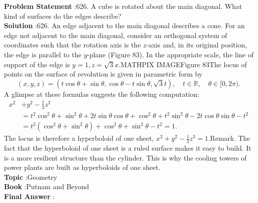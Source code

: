\documentclass[10pt]{article}
\begin{document}
\textbf{Problem Statement} :626. A cube is rotated about the main diagonal. What kind of surfaces do the edges describe?\\
\textbf{Solution} :626. An edge adjacent to the main diagonal describes a cone. For an edge not adjacent to the main diagonal, consider an orthogonal system of coordinates such that the rotation axis is the $z$-axis and, in its original position, the edge is parallel to the $y$-plane (Figure 83). In the appropriate scale, the line of support of the edge is $y=1, z=\sqrt{3} x$.MATHPIX IMAGEFigure 83The locus of points on the surface of revolution is given in parametric form by$$ (x, y, z)=(t \cos \theta+\sin \theta, \cos \theta-t \sin \theta, \sqrt{3} t), \quad t \in \mathbb{R}, \quad \theta \in[0,2 \pi) . $$A glimpse at these formulas suggests the following computation:$$ \begin{aligned} x^{2} &+y^{2}-\frac{1}{3} z^{2} \\ &=t^{2} \cos ^{2} \theta+\sin ^{2} \theta+2 t \sin \theta \cos \theta+\cos ^{2} \theta+t^{2} \sin ^{2} \theta-2 t \cos \theta \sin \theta-t^{2} \\ &=t^{2}\left(\cos ^{2} \theta+\sin ^{2} \theta\right)+\cos ^{2} \theta+\sin ^{2} \theta-t^{2}=1 . \end{aligned} $$The locus is therefore a hyperboloid of one sheet, $x^{2}+y^{2}-\frac{1}{3} z^{3}=1$.Remark. The fact that the hyperboloid of one sheet is a ruled surface makes it easy to build. It is a more resilient structure than the cylinder. This is why the cooling towers of power plants are built as hyperboloids of one sheet.\\
\textbf{Topic} :Geometry\\
\textbf{Book} :Putnam and Beyond\\
\textbf{Final Answer} :\\
\end{document}
